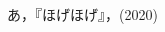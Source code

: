 \documentclass[uplatex,11pt,a4paper,dvipdfmx]{jsreport}
\begin{document}
\begin{thebibliography}{99}     %
\item%
あ，『ほげほげ』，(2020)
\end{thebibliography}
\end{document}
